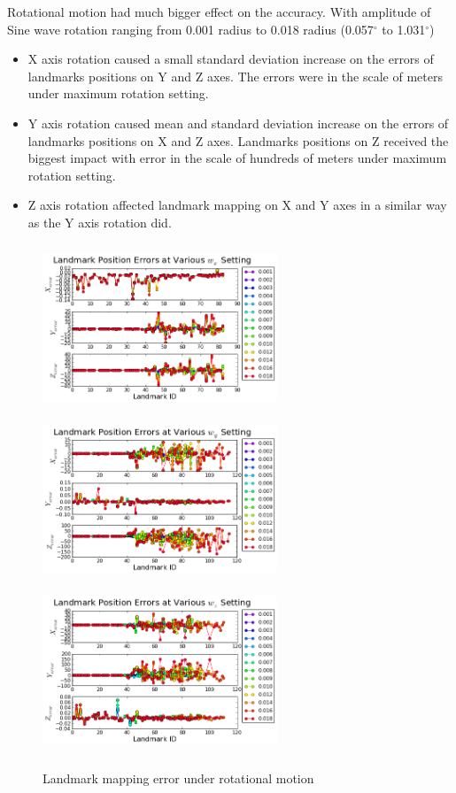 Rotational motion had much bigger effect on the accuracy. With
amplitude of Sine wave rotation ranging from 0.001 radius to 0.018
radius (0.057$^\circ$ to 1.031$^\circ$)

\begin{itemize}
  \item X axis rotation caused a small standard deviation increase on
  the errors of landmarks positions on Y and Z axes. The errors were in the
  scale of meters under maximum rotation setting.
  \item Y axis rotation caused mean and standard deviation increase on
  the errors of landmarks positions on X and Z axes. Landmarks positions on Z
  received the biggest impact with error in the scale of hundreds of
  meters under maximum rotation setting.
  \item Z axis rotation affected landmark mapping on X and Y axes in a
  similar way as the Y axis rotation did.
\end{itemize}
\FloatBarrier
\begin{figure}[h]
  \centering
  \includegraphics[width=7cm, height=5cm]{./Figures/SimulationFigures/Figure17.png}
  \includegraphics[width=7cm, height=5cm]{./Figures/SimulationFigures/Figure18.png}
  \includegraphics[width=7cm, height=5cm]{./Figures/SimulationFigures/Figure19.png}
  \caption{Landmark mapping error under rotational motion}
  \label{fig:simfig17-19}
\end{figure}

